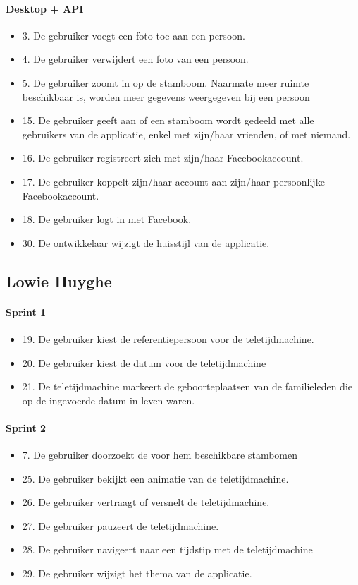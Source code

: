 \documentclass[pdftex,a4paper,12pt,twoside]{report}
\begin{document}
\paragraph{Desktop + API}
\begin{itemize}
\item 3. De gebruiker voegt een foto toe aan een persoon. 
\item 4. De gebruiker verwijdert een foto van een persoon.
\item 5. De gebruiker zoomt in op de stamboom. Naarmate meer ruimte beschikbaar is, worden meer 
gegevens weergegeven bij een persoon
\item 15. De gebruiker geeft aan of een stamboom wordt gedeeld met alle gebruikers van de applicatie, 
enkel met zijn/haar vrienden, of met niemand. 
\item 16. De gebruiker registreert zich met zijn/haar Facebookaccount. 
\item 17. De gebruiker koppelt zijn/haar account aan zijn/haar persoonlijke Facebookaccount. 
\item 18. De gebruiker logt in met Facebook. 
\item 30. De ontwikkelaar wijzigt de huisstijl van de applicatie.
\end{itemize}
 
\subsection{Lowie Huyghe}
\paragraph{Sprint 1}
\begin{itemize}
\item 19. De gebruiker kiest de referentiepersoon voor de teletijdmachine. 
\item 20. De gebruiker kiest de datum voor de teletijdmachine
\item 21. De teletijdmachine markeert de geboorteplaatsen van de familieleden die op de ingevoerde 
datum in leven waren. 
\end{itemize}
\paragraph{Sprint 2}
\begin{itemize}
\item 7. De gebruiker doorzoekt de voor hem beschikbare stambomen
\item 25. De gebruiker bekijkt een animatie van de teletijdmachine. 
\item 26. De gebruiker vertraagt of versnelt de teletijdmachine. 
\item 27. De gebruiker pauzeert de teletijdmachine. 
\item 28. De gebruiker navigeert naar een tijdstip met de teletijdmachine
\item 29. De gebruiker wijzigt het thema van de applicatie.
\end{itemize}
\end{document}
